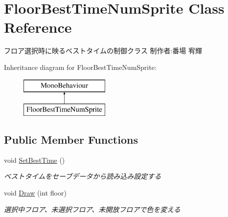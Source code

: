 \hypertarget{class_floor_best_time_num_sprite}{}\section{Floor\+Best\+Time\+Num\+Sprite Class Reference}
\label{class_floor_best_time_num_sprite}


フロア選択時に映るベストタイムの制御クラス 制作者\+:番場 宥輝  


Inheritance diagram for Floor\+Best\+Time\+Num\+Sprite\+:\begin{figure}[H]
\begin{center}
\leavevmode
\includegraphics[height=2.000000cm]{class_floor_best_time_num_sprite}
\end{center}
\end{figure}
\subsection*{Public Member Functions}
\begin{DoxyCompactItemize}
\item 
void \hyperlink{class_floor_best_time_num_sprite_a814f407e953d90bd1a5bdcd6af600536}{Set\+Best\+Time} ()
\begin{DoxyCompactList}\small\item\em ベストタイムをセーブデータから読み込み設定する \end{DoxyCompactList}\item 
void \hyperlink{class_floor_best_time_num_sprite_a6f427325ec7edcba5afd25ee56b793ac}{Draw} (int floor)
\begin{DoxyCompactList}\small\item\em 選択中フロア、未選択フロア、未開放フロアで色を変える \end{DoxyCompactList}\end{DoxyCompactItemize}
